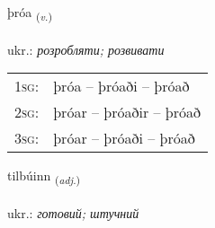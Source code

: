 \documentclass[frontgrid, backgrid]{flacards}\usepackage[]{graphicx}\usepackage[]{xcolor}
\begin{document}
\renewcommand{\blhead}{\vskip5pt {\small\bfseries\footnotesize Sagnorð | дієслово }}
\renewcommand{\bcfoot}{\vskip5pt \hspace{2pt}{\small\bfseries\footnotesize 1K}}


{þróa \small{\textsubscript{(\textit{v.})}} \\[1ex] %
\textphonetic{[θrouːa]} \\
ukr.: \emph{розробляти; розвивати} \\  [2ex]
\renewcommand*{\arraystretch}{0.8}
\begin{tabular}{p{1cm}l}
\textsc{1sg}: & þróa -- þróaði -- þróað \\ 
\textsc{2sg}: & þróar -- þróaðir -- þróað \\ 
\textsc{3sg}: & þróar -- þróaði -- þróað \\ 
\end{tabular}
}

\renewcommand{\flhead}{\vskip5pt \fboxsep=0pt {\small\bfseries\footnotesize Lýsingarorð | прикметник}}
\renewcommand{\fcfoot}{\vskip5pt \fboxsep=0pt \hspace{2pt}{\small\bfseries\footnotesize 1K}}

\renewcommand{\blhead}{\vskip5pt {\small\bfseries\footnotesize Lýsingarorð | прикметник }}
\renewcommand{\bcfoot}{\vskip5pt \hspace{2pt}{\small\bfseries\footnotesize 1K}}


{tilbúinn \small{\textsubscript{(\textit{adj.})}} \\[1ex] %
\textphonetic{[tʰɪlpuɪn]} \\
ukr.: \emph{готовий; штучний} \\  [2ex]
\renewcommand*{\arraystretch}{0.8}
}
\end{document}
